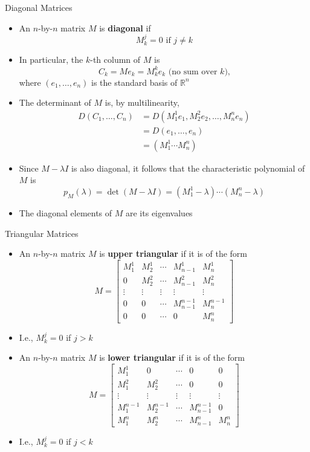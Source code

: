 \documentclass[usenames,dvipsnames,10pt]{beamer}
\newcommand{\R}{\mathbb{R}}
\begin{document}
\begin{frame}
  {Diagonal Matrices}

  \begin{itemize}
  \item An $n$-by-$n$ matrix $M$ is {\bf diagonal} if
    \[ M^j_k = 0\text{ if }j \ne k \]
  \item In particular, the $k$-th column of $M$ is
    \[ C_k = Me_k = M^k_ke_k\text{ (no sum over $k$),} \]
    where $(e_1, \dots, e_n)$ is the standard basis of $\R^n$
  \item The determinant of $M$ is, by multilinearity,
    \begin{align*}
      D(C_1, \dots, C_n) &= D(M^1_1e_1, M^2_2e_2, \dots, M^n_ne_n)\\ &= D(e_1, \dots, e_n)\\ &= (M^1_1\cdots M^n_n)
    \end{align*}
  \item Since $M-\lambda I$ is also diagonal, it follows that the characteristic polynomial of $M$ is
    \[
      p_M(\lambda) = \det(M-\lambda I) = (M^1_1-\lambda)\cdots(M^n_n-\lambda)
    \]
  \item The diagonal elements of $M$ are its eigenvalues
  \end{itemize}
\end{frame}

\begin{frame}
  {Triangular Matrices}

  \begin{itemize}
  \item An $n$-by-$n$ matrix $M$ is {\bf upper triangular} if it is of the form
    \[ M = \begin{bmatrix} M^1_1 & M^1_2 & \cdots & M^1_{n-1} & M^1_n \\ 0 & M^2_2 & \cdots & M^2_{n-1} & M^2_n \\ \vdots & \vdots & \vdots & \vdots & \vdots \\ 0 & 0 & \cdots & M^{n-1}_{n-1} & M^{n-1}_n \\ 0 & 0 & \cdots & 0 & M^n_n \end{bmatrix} \]
  \item I.e., $M^j_k = 0$ if $j > k$
  \item An $n$-by-$n$ matrix $M$ is {\bf lower triangular} if it is of the form
    \[ M = \begin{bmatrix} M^1_1 & 0 & \cdots & 0  & 0 \\ M^2_1 & M^2_2 & \cdots & 0 & 0 \\ \vdots & \vdots & \vdots & \vdots & \vdots \\ M^{n-1}_1 & M^{n-1}_2  & \cdots & M^{n-1}_{n-1} & 0 \\ M^n_1 & M^n_2 & \cdots & M^n_{n-1} & M^n_n \end{bmatrix} \]
  \item I.e., $M^j_k = 0$ if $j < k$
  \end{itemize}
\end{frame}
\end{document}
